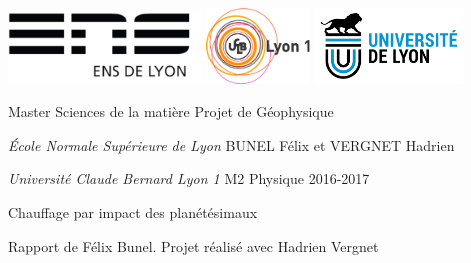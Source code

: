 \documentclass[10pt,a4paper]{article}
\author{BUNEL Félix et VERGNET Hadrien}
\numberwithin{equation}{section}
\begin{document}
\begin{titlepage}
\thispagestyle{empty}
\setlength{\parindent}{0pt}

\includegraphics[height=1.9cm]{logo-ens.jpg} \hfill \includegraphics[height=2cm]{logo_lyon1.jpg} \hfill \includegraphics[height=2cm]{logo_univ_lyon.jpg}



Master Sciences de la matière
\hfill
Projet de Géophysique

\textit{École Normale Supérieure de Lyon}
\hfill
BUNEL Félix et VERGNET Hadrien

\textit{Université Claude Bernard Lyon 1}
\hfill
M2 Physique 2016-2017
\vspace{0.5cm}

\hrulefill
\vspace{-0.6cm}

\hrulefill
\begin{center}\bfseries
\vspace{0.4cm}

\begin{huge}
	Chauffage par impact des planétésimaux    
\end{huge}
\vspace{0.5cm}

Rapport de Félix Bunel. Projet réalisé avec Hadrien Vergnet
\end{center}
\hrulefill
\vspace{-0.6cm}


\end{titlepage}
\end{document}
